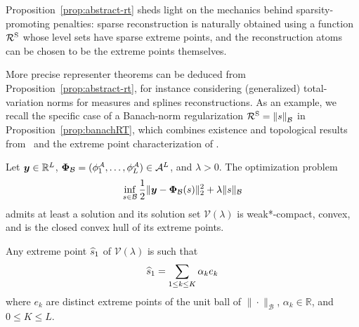 \documentclass[12pt]{article}
\begin{document}
    Proposition~\ref{prop:abstract-rt} sheds light on the mechanics behind sparsity-promoting penalties: sparse reconstruction is naturally obtained using a function $\mathcal{R}^{\mathrm{S}}$ whose level sets have sparse extreme points, and the reconstruction atoms can be chosen to be the extreme points themselves.

    More precise representer theorems can be deduced from Proposition~\ref{prop:abstract-rt}, for instance considering (generalized) total-variation norms for measures and splines reconstructions\cite{Fisher1975,Unser2016representer,unser2017splines,bredies2020sparsity,debarre2022sparsest}. As an example, we recall the specific case of a Banach-norm regularization $\mathcal{R}^\mathrm{S} = \left\lVert s\right\rVert_{\mathcal{B}}$ in Proposition~\ref{prop:banachRT}, which combines existence and topological results from~\cite[Proposition 8]{gupta2018continuous} and the extreme point characterization of \cite[Theorem 3.1]{boyer2019representer}.

    \begin{proposition}
    \label{prop:banachRT}
    Let $\bm{y}\in \mathbb{R}^L$, ${\bm{\Phi}_\mathcal{B}}= (\phi^\mathcal{A}_1 ,\ldots , \phi^\mathcal{A}_L) \in \mathcal{A}^L$, and $\lambda > 0$. The optimization problem 
    \begin{equation} \label{eq:banachpb}
        \inf_{s \in \mathcal{B}} \frac{1}{2} \| \bm{y} - {\bm{\Phi}_\mathcal{B}}(s) \|_2^2 + \lambda \| s \|_{\mathcal{B}}
    \end{equation}
    admits at least a solution and its solution set $\mathcal{V} (\lambda)$ is weak*-compact, convex, and is the closed convex hull of its extreme points.

    Any extreme point $\widehat{s}_1$ of $\mathcal{V} (\lambda)$ is such that 
    \begin{equation} \label{eq:widehatbanachextreme}
        \widehat{s}_1  = \sum_{1 \leq k \leq K} \alpha_k e_k
    \end{equation}
    where $e_k$ are distinct extreme points of the unit ball of $\|\cdot \|_{\mathcal{B}}$,  $\alpha_k \in \mathbb{R}$, and $0 \leq K \leq L$.
    \end{proposition}

\end{document}
